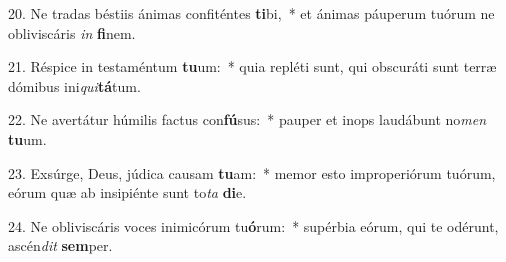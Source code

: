 20. Ne tradas béstiis ánimas confiténtes \textbf{ti}bi,~*  et ánimas páuperum tuórum ne obliviscáris \textit{in} \textbf{fi}nem.\

21. Réspice in testaméntum \textbf{tu}um:~*  quia repléti sunt, qui obscuráti sunt terræ dómibus ini\textit{qui}\textbf{tá}tum.\

22. Ne avertátur húmilis factus con\textbf{fú}sus:~*  pauper et inops laudábunt no\textit{men} \textbf{tu}um.\

23. Exsúrge, Deus, júdica causam \textbf{tu}am:~*  memor esto improperiórum tuórum, eórum quæ ab insipiénte sunt to\textit{ta} \textbf{di}e.\

24. Ne obliviscáris voces inimicórum tu\textbf{ó}rum:~*  supérbia eórum, qui te odérunt, ascén\textit{dit} \textbf{sem}per.\

